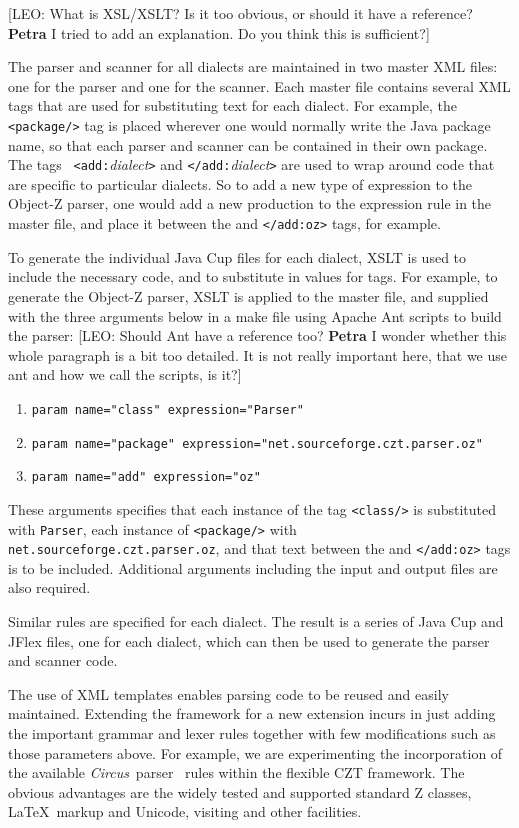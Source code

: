 \documentclass{llncs}
\newcommand{\Circus}{{\sf\slshape Circus}}
\begin{document}
  [LEO: What is XSL/XSLT? Is it too obvious, or should it have a
  reference? {\bf Petra} I tried to add an explanation.  Do you think
  this is sufficient?]

The parser and scanner for all dialects are maintained in two master
XML files: one for the parser and one for the scanner. Each master
file contains several XML tags that are used for substituting text for
each dialect. For example, the {\tt <package/>} tag is placed wherever
one would normally write the Java package name, so that each parser
and scanner can be contained in their own package. The tags {\tt
<add:}{\em dialect}{\tt >} and {\tt </add:}{\em dialect}{\tt >} are
used to wrap around code that are specific to particular dialects. So
to add a new type of expression to the Object-Z parser, one would add
a new production to the expression rule in the master file, and place
it between the {\tt <add:oz>} and {\tt </add:oz>} tags, for example.

To generate the individual Java Cup files for each dialect, XSLT is
used to include the necessary code, and to substitute in values for
tags. For example, to generate the Object-Z parser, XSLT is applied to
the master file, and supplied with the three arguments below in a make
file using Apache Ant scripts to build the parser: [LEO: Should Ant
have a reference too? {\bf Petra} I wonder whether this whole paragraph
is a bit too detailed.  It is not really important here, that we use
ant and how we call the scripts, is it?]
\begin{enumerate}
  \item {\tt param name="class" expression="Parser"}
  \item {\tt param name="package" expression="net.sourceforge.czt.parser.oz"}
  \item {\tt param name="add" expression="{oz}"}
\end{enumerate}

These arguments specifies that each instance of the tag {\tt <class/>} is
substituted with {\tt Parser}, each instance of {\tt <package/>} with
{\tt net.sourceforge.czt.parser.oz}, and that text between the
{\tt <add:oz>} and {\tt </add:oz>} tags is to be included. Additional
arguments including the input and output files are also required.

Similar rules are specified for each dialect. The result is a series
of Java Cup and JFlex files, one for each dialect, which can then be
used to generate the parser and scanner code.

The use of XML templates enables parsing code to be reused and easily maintained.
Extending the framework for a new extension incurs in just adding the important
grammar and lexer rules together with few modifications such as those parameters above.
For example, we are experimenting the incorporation of the available \Circus\
parser~\cite{circus.other:parser} rules within the flexible CZT framework. The
obvious advantages are the widely tested and supported standard Z classes, \LaTeX\
markup and Unicode, visiting and other facilities.
\end{document}
